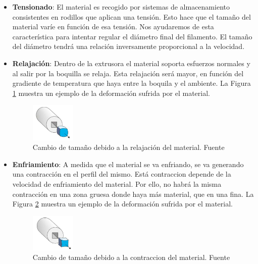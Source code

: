\begin{itemize}
	\item {\textbf{Tensionado}: El material es recogido por sistemas de almacenamiento consistentes en rodillos que aplican una tensión. Esto hace que el tamaño del material varíe en función de esa tensión. Nos ayudaremos de esta característica para intentar regular el diámetro final del filamento. El tamaño del diámetro tendrá una relación inversamente proporcional a la velocidad.}
	\item {\textbf{Relajación}: Dentro de la extrusora el material soporta esfuerzos normales y al salir por la boquilla se relaja. Esta relajación será mayor, en función del gradiente de temperatura que haya entre la boquila y el ambiente. La Figura \ref{fig:prod_relajacion} muestra un ejemplo de la deformación sufrida por el material.
		\begin{figure}[H]
	        \centering
	        \includegraphics[width=0.2\textwidth]{images/producciones/relajacion.png}
	        \caption[Cambio de tamaño debido a la relajación del material.]{Cambio de tamaño debido a la relajación del material. Fuente \cite{tecno_polimeros}}
	        \label{fig:prod_relajacion}
		\end{figure}
	}
	\item {\textbf{Enfriamiento}: A medida que el material se va enfriando, se va generando una contracción en el perfil del mismo. Está contraccion depende de la velocidad de enfriamiento del material. Por ello, no habrá la misma contracción en una zona gruesa donde haya más material, que en una fina. La Figura \ref{fig:prod_contraccion} muestra un ejemplo de la deformación sufrida por el material.
		\begin{figure}[H]
	        \centering
	        \includegraphics[width=0.2\textwidth]{images/producciones/contraccion.png}
	        \caption[Cambio de tamaño debido a la contraccion del material.]{Cambio de tamaño debido a la contraccion del material. Fuente \cite{tecno_polimeros}}
	        \label{fig:prod_contraccion}
		\end{figure}
	}
\end{itemize}

